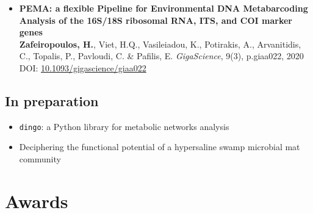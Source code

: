 \begin{itemize}
   \item{
      \textbf{PEMA: a flexible Pipeline for Environmental DNA Metabarcoding Analysis of the 16S/18S ribosomal RNA, ITS, and COI marker genes} \\ 
      \textbf{Zafeiropoulos, H.}, Viet, H.Q., Vasileiadou, K., Potirakis, A., Arvanitidis, C., Topalis, P., Pavloudi, C. \& Pafilis, E. \textit{GigaScience}, 9(3), p.giaa022, 2020
      DOI: \href{https://doi.org/10.1093/gigascience/giaa022}{10.1093/gigascience/giaa022}
   }

\end{itemize}


\subsection*{In preparation}

\begin{itemize}
   \item \texttt{dingo}: a Python library for metabolic networks analysis 
   \item Deciphering the functional potential of a hypersaline swamp microbial mat community
\end{itemize}






\section*{Awards}

